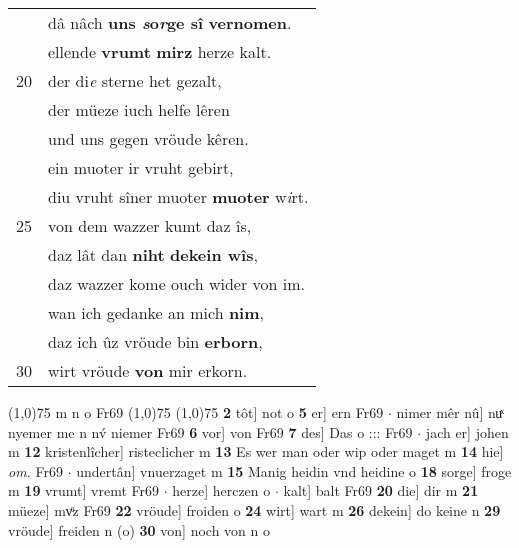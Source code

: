 \documentclass[8pt,a4paper,notitlepage]{article}
\begin{document}
\begin{table}[ht]
\begin{minipage}[t]{0.5\linewidth}
\begin{tabular}{rl}
 & dâ nâch \textbf{uns \textit{s}o\textit{r}ge sî} \textbf{vernomen}.\\ 
 & ellende \textbf{vrumt} \textbf{mirz} herze kalt.\\ 
20 & der di\textit{e} sterne het gezalt,\\ 
 & der müeze iuch helfe lêren\\ 
 & und uns gegen vröude kêren.\\ 
 & ein muoter ir vruht gebirt,\\ 
 & diu vruht sîner muoter \textbf{muoter} w\textit{i}rt.\\ 
25 & von dem wazzer kumt daz îs,\\ 
 & daz lât dan \textbf{niht} \textbf{dekein wîs},\\ 
 & daz wazzer kome ouch wider von im.\\ 
 & wan ich gedanke an mich \textbf{nim},\\ 
 & daz ich ûz vröude bin \textbf{erborn},\\ 
30 & wirt vröude \textbf{von} mir erkorn.\\ 
\end{tabular}
\scriptsize
\line(1,0){75} \newline
m n o Fr69 \newline
\line(1,0){75} \newline
\newline
\line(1,0){75} \newline
\textbf{2} tôt] not o \textbf{5} er] ern Fr69  $\cdot$ nimer mêr nû] nuͯ nyemer me n nv́ niemer Fr69 \textbf{6} vor] von Fr69 \textbf{7} des] Das o ::: Fr69  $\cdot$ jach er] johen m \textbf{12} kristenlîcher] risteclicher m \textbf{13} Es wer man oder wip oder maget m \textbf{14} hie] \textit{om.} Fr69  $\cdot$ undertân] vnuerzaget m \textbf{15} Manig heidin vnd heidine o \textbf{18} sorge] froge m \textbf{19} vrumt] vremt Fr69  $\cdot$ herze] herczen o  $\cdot$ kalt] balt Fr69 \textbf{20} die] dir m \textbf{21} müeze] mvͦz Fr69 \textbf{22} vröude] froiden o \textbf{24} wirt] wart m \textbf{26} dekein] do keine n \textbf{29} vröude] freiden n (o) \textbf{30} von] noch von n o \newline
\end{minipage}
\end{table}
\newpage
\end{document}
